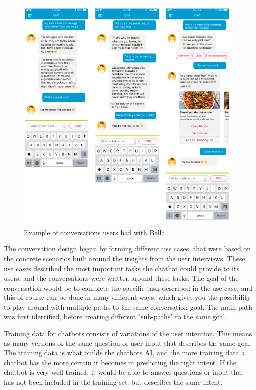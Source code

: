     \begin{figure}[H]
        \centering
        \includegraphics {figures/conversationflow_2.png}
        \caption{Example of conversations users had with Bella}
        \label{fig:convflow}
    \end{figure}
    
    The conversation design began by forming different use cases, that were based on the concrete scenarios built around the insights from the user interviews. These use cases described the most important tasks the chatbot could provide to its users, and the conversations were written around these tasks. The goal of the conversation would be to complete the specific task described in the use case, and this of course can be done in many different ways, which gives you the possibility to play around with multiple paths to the same conversation goal. The main path was first identified, before creating different "sub-paths" to the same goal. 
    
    Training data for chatbots consists of variations of the user intention. This means as many versions of the same question or user input that describes the same goal. The training data is what builds the chatbots AI, and the more training data a chatbot has the more certain it becomes in predicting the right intent. If the chatbot is very well trained, it would be able to answer questions or input that has not been included in the training set, but describes the same intent.

